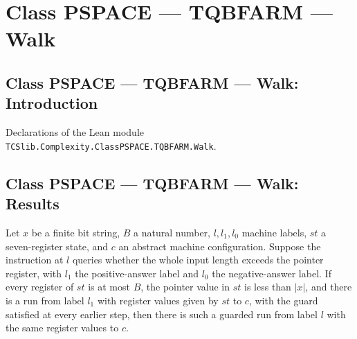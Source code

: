 \section{Class PSPACE --- TQBFARM --- Walk}
\subsection*{Class PSPACE --- TQBFARM --- Walk: Introduction}

Declarations of the Lean module \texttt{TCSlib.Complexity.ClassPSPACE.TQBFARM.Walk}.

\subsection*{Class PSPACE --- TQBFARM --- Walk: Results}

\begin{lemma}
\label{Complexity.LogProg.TQBFARM.len_t}
\leanok
{}
Let $x$ be a finite bit string, $B$ a natural number, $l,l_1,l_0$ machine labels, $st$ a
seven-register state, and $c$ an abstract machine configuration. Suppose the instruction
at $l$ queries whether the whole input length exceeds the pointer register, with $l_1$
the positive-answer label and $l_0$ the negative-answer label. If every register of $st$
is at most $B$, the pointer value in $st$ is less than $|x|$, and there is a run from
label $l_1$ with register values given by $st$ to $c$, with the guard satisfied at every
earlier step, then there is such a guarded run from label $l$ with the same register
values to $c$.
\end{lemma}

